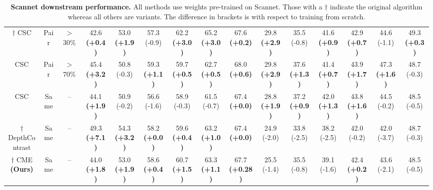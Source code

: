 \documentclass[10pt,twocolumn,letterpaper]{article}
\begin{document}
\begin{table}[ht!]
{\begin{tabular}{ c | c c | c c c c c c | c c c c c c |}
            $\dagger$ CSC \cite{hou2021Exploring}               & Pair & $>$ 30\% & 42.6 \textbf{(+0.4)}                               & 53.0 \textbf{(+1.9)}                                  & 57.3 (-0.9)          & 62.2 \textbf{(+3.0)} & 65.2 \textbf{(+3.0)} & 67.6 \textbf{(+0.2)}  & 29.8 \textbf{(+2.9)} & 35.5 (-0.8)          & 41.6 \textbf{(+0.9)} & 42.9 \textbf{(+0.7)} & 44.6 (-1.1)          & 49.3 \textbf{(+0.3)} \\
            CSC \cite{hou2021Exploring}                         & Pair & $>$ 70\% & 45.4 \textbf{(+3.2)}                               & 50.8 (-0.3)                                           & 59.3 \textbf{(+1.1)} & 59.7 \textbf{(+0.5)} & 62.7 \textbf{(+0.5)} & 68.0 \textbf{(+0.6)}  & 29.8 \textbf{(+2.9)} & 37.6 \textbf{(+1.3)} & 41.4 \textbf{(+0.7)} & 43.9 \textbf{(+1.7)} & 47.3 \textbf{(+1.6)} & 48.7 (-0.3)          \\
            CSC \cite{hou2021Exploring}                         & Same & --       & 44.1 \textbf{(+1.9)}                               & 50.9 (-0.2)                                           & 56.6 (-1.6)          & 58.9 (-0.3)          & 61.5 (-0.7)          & 67.4 \textbf{(+0.0)}  & 28.8 \textbf{(+1.9)} & 37.2 \textbf{(+0.9)} & 42.0 \textbf{(+1.3)} & 43.8 \textbf{(+1.6)} & 44.5 (-0.2)          & 48.5 (-0.5)          \\
            $\dagger$ DepthContrast \cite{zhang2021Self}        & Same & --       & 49.3 \textbf{(+7.1)}                               & 54.3 \textbf{(+3.2)}                                  & 58.2 \textbf{(+0.0)} & 59.6 \textbf{(+0.4)} & 63.2 \textbf{(+1.0)} & 67.4 \textbf{(+0.0)}  & 24.9 (-2.0)          & 33.8 (-2.5)          & 38.2 (-2.5)          & 42.0 (-0.2)          & 42.0 (-3.7)          & 48.7 (-0.3)          \\
            \hline
            $\dagger$ CME \textbf{(Ours)}                       & Same & --       & 44.0 \textbf{(+1.8)}                               & 53.0 \textbf{(+1.9)}                                  & 58.6 \textbf{(+0.4)} & 60.7 \textbf{(+1.5)} & 63.3 \textbf{(+1.1)} & 67.7 \textbf{(+0.28)} & 25.5 (-1.4)          & 35.5 (-0.8)          & 39.1 (-1.6)          & 42.4 \textbf{(+0.2)} & 43.6 (-2.1)          & 48.5 (-0.5)          \\
        \end{tabular}
    }
    \caption{\textbf{Scannet downstream performance.} All methods use weights pre-trained on Scannet. Those with a † indicate the original algorithm whereas all others are variants. The difference in brackets is with respect to training from scratch. }
    \label{table:scannetVaryingDataAmount}
\end{table}
\end{document}
